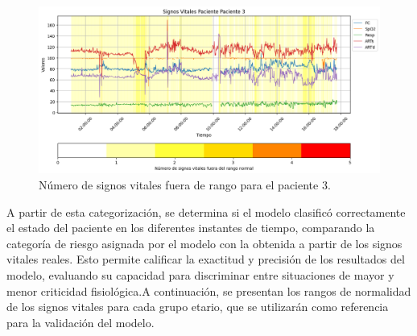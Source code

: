 \begin{figure}[H]
  \centering
  \includegraphics[width=\textwidth]{Images/patient3_signos_vitales_fuera_de_rango_2.png}
  \caption{Número de signos vitales fuera de rango para el paciente 3.}
  \label{fig:patient3_signos_vitales_fuera_de_rango}
\end{figure}

A partir de esta categorización, se determina si el modelo clasificó correctamente el estado del paciente en los diferentes instantes de tiempo, comparando la categoría de riesgo asignada por el modelo con la obtenida a partir de los signos vitales reales. Esto permite calificar la exactitud y precisión de los resultados del modelo, evaluando su capacidad para discriminar entre situaciones de mayor y menor criticidad fisiológica.A continuación, se presentan los rangos de normalidad de los signos vitales para cada grupo etario, que se utilizarán como referencia para la validación del modelo.

\begin{table}[H]
  \centering
  \caption{Rangos normales de signos vitales según grupo etario. ARTs: Presión arterial sistólica; ARTd: Presión arterial diastólica; FC: Frecuencia cardíaca; Resp: Frecuencia respiratoria; SpO$_2$: Saturación de oxígeno.}
  \label{tab:rangos_signos_vitales}
\end{table}

